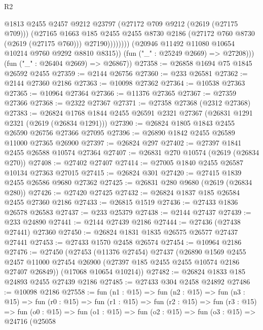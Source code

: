 \begin{lexlean}{R2}
\begin{coremodule}
                          @1813
                          @2455
                          @2457
                          @9212
                          @23797
                          (@27172 @709 @9212 (@2619 (@27175 @709)))
                          (@27165
                            @1663
                            @185
                            @2455
                            @2455
                            @8730
                            @2186
                            (@27172 @760 @8730 (@2619 (@27175 @760)))
                            @27190))))))))
            (@20946 @11492 @11080 @10654 @10214 @9760 @9292 @8810 @8315))
          (fun ("_" : @25249 @2669) => @27208)))
      (fun ("_" : @26404 @2669) => @26867))
@27358 := @26858 @1694 @75 @1845 @26592 @2455
@27359 := @2144 @26756
@27360 := @233 @26581
@27362 := @2144 @27360 @2186
@27363 := @10098 @27362
@27364 := @10538 @27363
@27365 := @10964 @27364
@27366 := @11376 @27365
@27367 := @27359 @27366
@27368 := @2322 @27367
@27371 := @27358 @27368 (@2312 @27368)
@27383 := @26824 @1768 @1844 @2455 @26591 @2321 @27367 (@26831 @1291 @2321 (@2619 (@26834 @1291)))
@27390 := @26824 @1805 @1843 @2455 @26590 @26756 @27366 @27095
@27396 := @26890 @1842 @2455 @26589 @11000 @27365 @26900
@27397 := @26824 @297
@27402 := @27397 @1841 @2455 @26588 @10574 @27364
@27407 := @26831 @270 @10574 (@2619 (@26834 @270))
@27408 := @27402 @27407
@27414 := @27005 @1840 @2455 @26587 @10134 @27363 @27015
@27415 := @26824 @301
@27420 := @27415 @1839 @2455 @26586 @9680 @27362
@27425 := @26831 @280 @9680 (@2619 (@26834 @280))
@27426 := @27420 @27425
@27432 := @26824 @1837 @185 @26584 @2455 @27360 @2186
@27433 := @26815 @1519
@27436 := @27433 @1836 @26578 @26583
@27437 := @233 @25379
@27438 := @2144 @27437
@27439 := @233 @24890
@27441 := @2144 @27439 @2186
@27444 := @27436 (@27438 @27441) @27360
@27450 := @26824 @1831 @1835 @26575 @26577 @27437 @27441
@27453 := @27433 @1570 @2458 @26574
@27454 := @10964 @2186
@27476 := @27450
    (@27453
      (@11376 @27454)
      @27437
      (@26890
        @1569
        @2455
        @2457
        @11000
        @27454
        @26900
        (@27397 @185 @2455 @2455 @10574 @2186 @27407 @26849))
      (@17068 @10654 @10214))
@27482 := @26824 @1833 @185 @24893 @2455 @27439 @2186
@27485 := @27433 @304 @2458 @24892
@27486 := @10098 @2186
@27558 := fun (n1 : @15) =>
  fun (n2 : @15) =>
  fun (n3 : @15) =>
  fun (r0 : @15) =>
  fun (r1 : @15) =>
  fun (r2 : @15) =>
  fun (r3 : @15) =>
  fun (o0 : @15) =>
  fun (o1 : @15) =>
  fun (o2 : @15) =>
  fun (o3 : @15) =>
  @24716
    (@25058

\end{coremodule}
\end{lexlean}
